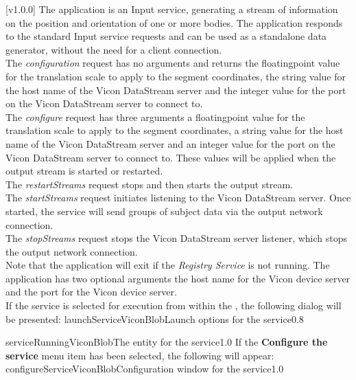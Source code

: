 [v1.0.0]
The  application is an Input service,
generating a stream of information on the position and orientation of one or more bodies.
The application responds to the standard Input service requests and can be used as a
standalone data generator, without the need for a client connection.\\

The \emph{configuration} request has no arguments and returns the floating\longDash{}point
value for the translation scale to apply to the segment coordinates, the string value for
the host name of the Vicon DataStream server and the integer value for the port on the
Vicon DataStream server to connect to.\\

The \emph{configure} request has three arguments \longDash{} a floating\longDash{}point
value for the translation scale to apply to the segment coordinates, a string value for
the host name of the Vicon DataStream server and an integer value for the port on the
Vicon DataStream server to connect to.
These values will be applied when the output stream is started or restarted.\\ 

The \emph{restartStreams} request stops and then starts the output stream.\\

The \emph{startStreams} request initiates listening to the Vicon DataStream
server.
Once started, the service will send groups of subject data via the output \yarp{} network
connection.\\

The \emph{stopStreams} request stops the Vicon DataStream server listener, which stops the
output \yarp{} network connection.\\ 

Note that the application will exit if the \emph{Registry Service} is not running.
The application has two optional arguments \longDash{} the host name for the Vicon device
server and the port for the Vicon device server.
\insertAppParameters
\insertTagDescription{\VDSI}
\insertInputServiceComment\\

\insertStandardServiceCommands
\secondaryEnd
\condPage
{}
If the service is selected for execution from within the \emph{\MMMU}, the following
dialog will be presented:
%
{launchServiceViconBlob}{Launch options for the \VBI{} service}{0.8}

%
{serviceRunningViconBlob}{The \emph{\MMMU} entity for the \VBI{} service}{1.0}
\condPage{}
If the \textbf{Configure the service} menu item has been selected, the following will
appear:
%
{configureServiceViconBlob}{Configuration window for the \emph{\VBI} service}{1.0}
\secondaryEnd
\primaryEnd{}
